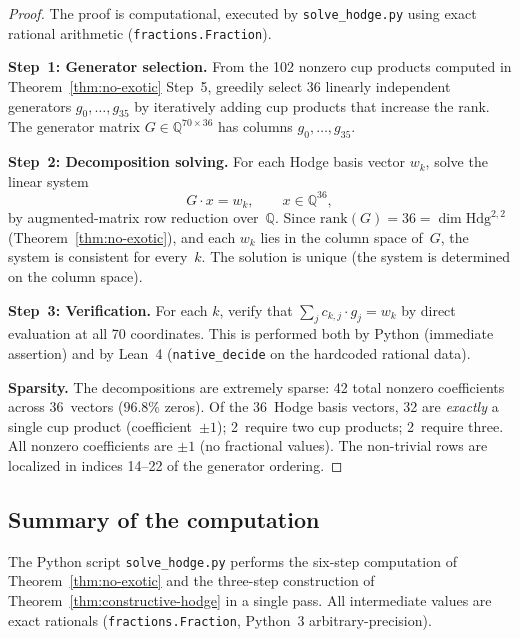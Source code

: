 \documentclass[11pt]{article}
\theoremstyle{plain}
\theoremstyle{definition}
\theoremstyle{remark}
\newcommand{\Q}{\mathbb{Q}}
\newcommand{\Hdg}{\mathrm{Hdg}}
\begin{document}
\begin{proof}
The proof is computational, executed by \texttt{solve\_hodge.py}
using exact rational arithmetic (\texttt{fractions.Fraction}).

\smallskip\noindent
\textbf{Step~1: Generator selection.}
From the 102 nonzero cup products computed in
Theorem~\ref{thm:no-exotic} Step~5, greedily select 36 linearly
independent generators $g_0, \ldots, g_{35}$ by iteratively adding
cup products that increase the rank.  The generator matrix
$G \in \Q^{70 \times 36}$ has columns $g_0, \ldots, g_{35}$.

\smallskip\noindent
\textbf{Step~2: Decomposition solving.}
For each Hodge basis vector $w_k$, solve the linear system
\begin{equation}\label{eq:decomp}
  G \cdot x = w_k, \qquad x \in \Q^{36},
\end{equation}
by augmented-matrix row reduction over~$\Q$.  Since
$\mathrm{rank}(G) = 36 = \dim \Hdg^{2,2}$ (Theorem~\ref{thm:no-exotic}),
and each $w_k$ lies in the column space of~$G$, the system is
consistent for every~$k$.  The solution is unique (the system is
determined on the column space).

\smallskip\noindent
\textbf{Step~3: Verification.}
For each $k$, verify that $\sum_{j} c_{k,j} \cdot g_j = w_k$ by
direct evaluation at all 70 coordinates.  This is performed both
by Python (immediate assertion) and by Lean~4
(\texttt{native\_decide} on the hardcoded rational data).

\smallskip\noindent
\textbf{Sparsity.}
The decompositions are extremely sparse: 42 total nonzero
coefficients across 36~vectors ($96.8\%$ zeros).  Of the 36~Hodge
basis vectors, 32 are \emph{exactly} a single cup product
(coefficient~$\pm 1$); 2~require two cup products; 2~require three.
All nonzero coefficients are $\pm 1$ (no fractional values).
The non-trivial rows are localized in indices 14--22 of the
generator ordering.
\end{proof}

\subsection{Summary of the computation}

The Python script \texttt{solve\_hodge.py} performs the six-step
computation of Theorem~\ref{thm:no-exotic} and the three-step
construction of Theorem~\ref{thm:constructive-hodge} in a single
pass.  All intermediate values are exact rationals
(\texttt{fractions.Fraction}, Python~3 arbitrary-precision).
\end{document}

